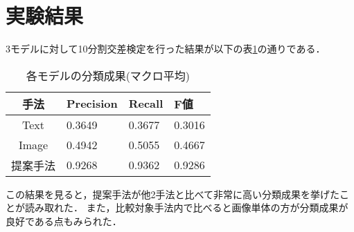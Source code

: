 \section{実験結果}
3モデルに対して10分割交差検定を行った結果が以下の表\ref{table:result}の通りである．
% 
\begin{table}[h]
    \caption{各モデルの分類成果(マクロ平均)}
    \label{table:result}
    \centering
    \begin{tabular}{clll}
        \hline
        手法 & Precision & Recall & F値 \\
        \hline \hline
        Text & 0.3649 & 0.3677 & 0.3016 \\
        Image & 0.4942 & 0.5055 & 0.4667 \\
        提案手法 & 0.9268 & 0.9362 & 0.9286 \\
        \hline
    \end{tabular}
\end{table}

この結果を見ると，提案手法が他2手法と比べて非常に高い分類成果を挙げたことが読み取れた．
また，比較対象手法内で比べると画像単体の方が分類成果が良好である点もみられた．
